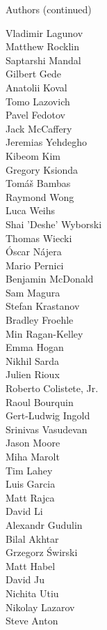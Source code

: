 \begin{frame}{Authors (continued)}
\begin{multicols}{5}
\tiny
Vladimir Lagunov\\
Matthew Rocklin\\
Saptarshi Mandal\\
Gilbert Gede\\
Anatolii Koval\\
Tomo Lazovich\\
Pavel Fedotov\\
Jack McCaffery\\
Jeremias Yehdegho\\
Kibeom Kim\\
Gregory Ksionda\\
Tomáš Bambas\\
Raymond Wong\\
Luca Weihs\\
Shai 'Deshe' Wyborski\\
Thomas Wiecki\\
Óscar Nájera\\
Mario Pernici\\
Benjamin McDonald\\
Sam Magura\\
Stefan Krastanov\\
Bradley Froehle\\
Min Ragan-Kelley\\
Emma Hogan\\
Nikhil Sarda\\
Julien Rioux\\
Roberto Colistete, Jr.\\
Raoul Bourquin\\
Gert-Ludwig Ingold\\
Srinivas Vasudevan\\
Jason Moore\\
Miha Marolt\\
Tim Lahey\\
Luis Garcia\\
Matt Rajca\\
David Li\\
Alexandr Gudulin\\
Bilal Akhtar\\
Grzegorz Świrski\\
Matt Habel\\
David Ju\\
Nichita Utiu\\
Nikolay Lazarov\\
Steve Anton\\

\end{multicols}
\end{frame}
